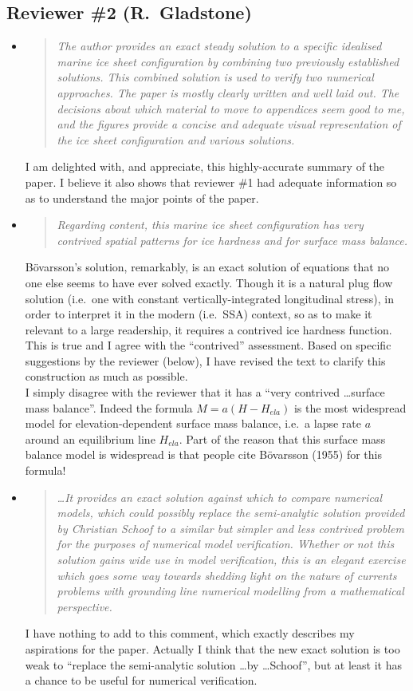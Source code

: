 \documentclass[11pt,reqno]{amsart}
\renewcommand{\dh}{\fontencoding{T1}\selectfont{\symbol{240}}}
\newcommand{\bod}{B\"o\dh varsson\xspace}
\newcommand{\citebod}{B\"o\dh varsson (1955)\nocite{Bodvardsson}\xspace}
\newcommand{\reply}[2]{
\medskip\medskip
\item  \begin{quote}
\emph{#1}
\end{quote}

\medskip
\noindent #2}
\begin{document}
\subsection*{Reviewer \#2 (R.~Gladstone)}  \begin{itemize}
\reply{The author provides an exact steady solution to a specific idealised marine ice sheet configuration by combining two previously established solutions. This combined solution is used to verify two numerical approaches. The paper is mostly clearly written and well laid out. The decisions about which material to move to appendices seem good to me, and the figures provide a concise and adequate visual representation of the ice sheet configuration and various solutions.}
{I am delighted with, and appreciate, this highly-accurate summary of the paper.  I believe it also shows that reviewer \#1 had adequate information so as to understand the major points of the paper.}

\reply{Regarding content, this marine ice sheet configuration has very contrived spatial patterns for ice hardness and for surface mass balance.}
{\bod's solution, remarkably, is an exact solution of equations that no one else seems to have ever solved exactly.  Though it is a natural plug flow solution (i.e.~one with constant vertically-integrated longitudinal stress), in order to interpret it in the modern (i.e.~SSA) context, so as to make it relevant to a large readership, it requires a contrived ice hardness function.  This is true and I agree with the ``contrived'' assessment.  Based on specific suggestions by the reviewer (below), I have revised the text to clarify this construction as much as possible. \medskip \\
I simply disagree with the reviewer that it has a ``very contrived \dots surface mass balance''.  Indeed the formula $M=a(H-H_{ela})$ is the most widespread model for elevation-dependent surface mass balance, i.e.~a lapse rate $a$ around an equilibrium line $H_{ela}$.  Part of the reason that this surface mass balance model is widespread is that people cite \citebod for this formula!}

\reply{\dots It provides an exact solution against which to compare numerical models, which could possibly replace the semi-analytic solution provided by Christian Schoof to a similar but simpler and less contrived problem for the purposes of numerical model verification.  Whether or not this solution gains wide use in model verification, this is an elegant exercise which goes some way towards shedding light on the nature of currents problems with grounding line numerical modelling from a mathematical perspective.}
{I have nothing to add to this comment, which exactly describes my aspirations for the paper.  Actually I think that the new exact solution is too weak to ``replace the semi-analytic solution \dots by \dots Schoof'', but at least it has a chance to be useful for numerical verification.}


\end{itemize}
\end{document}
